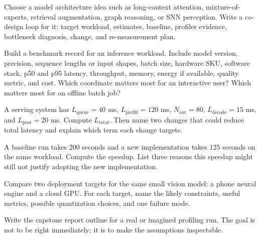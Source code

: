 \begin{exercises}
\item Choose a model architecture idea such as long-context attention, mixture-of-experts, retrieval augmentation, graph reasoning, or SNN perception. Write a co-design loop for it: target workload, estimates, baseline, profiler evidence, bottleneck diagnosis, change, and re-measurement plan.
\item Build a benchmark record for an inference workload. Include model version, precision, sequence lengths or input shapes, batch size, hardware SKU, software stack, p50 and p95 latency, throughput, memory, energy if available, quality metric, and cost. Which coordinate matters most for an interactive user? Which matters most for an offline batch job?
\item A serving system has \(L_{\text{queue}}=40\) ms, \(L_{\text{prefill}}=120\) ms, \(N_{\text{out}}=80\), \(L_{\text{decode}}=15\) ms, and \(L_{\text{post}}=20\) ms. Compute \(L_{\text{total}}\). Then name two changes that could reduce total latency and explain which term each change targets.
\item A baseline run takes 200 seconds and a new implementation takes 125 seconds on the same workload. Compute the speedup. List three reasons this speedup might still not justify adopting the new implementation.
\item Compare two deployment targets for the same small vision model: a phone neural engine and a cloud GPU. For each target, name the likely constraints, useful metrics, possible quantization choices, and one failure mode.
\item Write the capstone report outline for a real or imagined profiling run. The goal is not to be right immediately; it is to make the assumptions inspectable.
\end{exercises}
